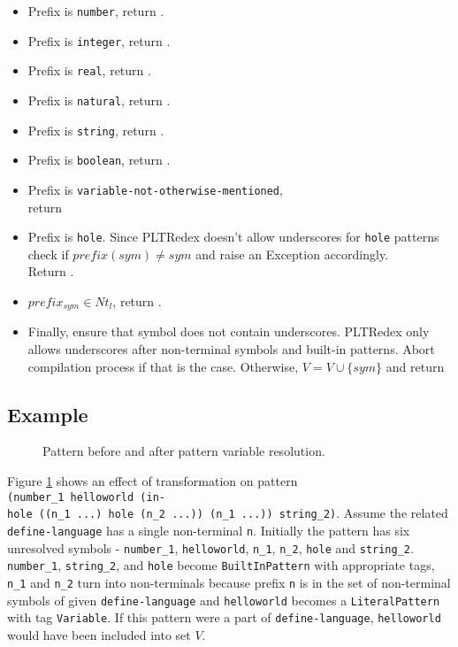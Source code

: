\begin{itemize}
\item Prefix is \texttt{number}, return .
\item Prefix is \texttt{integer}, return .
\item Prefix is \texttt{real}, return .
\item Prefix is \texttt{natural}, return .
\item Prefix is \texttt{string}, return .
\item Prefix is \texttt{boolean}, return .
\item Prefix is \texttt{variable-not-otherwise-mentioned}, \\ return 
\item Prefix is \texttt{hole}. Since PLTRedex doesn't allow underscores for \texttt{hole} patterns check if $\mathit{prefix(sym) \neq sym}$ and raise an Exception accordingly. \\ Return .
\item $\mathit{prefix_{sym} \in Nt_l}$, return .
\item Finally, ensure that symbol does not contain underscores. PLTRedex only allows underscores after non-terminal symbols and built-in patterns. Abort compilation process if that is the case. Otherwise, $V=V\cup\{\mathit{sym}\}$ and return 
\end{itemize}

\subsection{Example}

\begin{figure}[ht]
\caption{Pattern before and after pattern variable resolution.}
\label{transformation-pattern-resolvesym}
\end{figure}

Figure \ref{transformation-pattern-resolvesym} shows an effect of transformation on pattern \texttt{(number\_1\ helloworld\ (in-hole\ ((n\_1\ ...)\ hole\ (n\_2\ ...))\ (n\_1\ ...))\ string\_2)}. Assume the related \texttt{define-language} has a single non-terminal \texttt{n}. Initially the pattern has six unresolved symbols - \texttt{number\_1}, \texttt{helloworld}, \texttt{n\_1}, \texttt{n\_2}, \texttt{hole} and \texttt{string\_2}. \texttt{number\_1}, \texttt{string\_2}, and \texttt{hole} become \texttt{BuiltInPattern} with appropriate tags,  \texttt{n\_1} and \texttt{n\_2} turn into non-terminals because prefix \texttt{n} is in the set of non-terminal symbols of given \texttt{define-language} and \texttt{helloworld} becomes a \texttt{LiteralPattern} with tag \texttt{Variable}. If this pattern were a part of \texttt{define-language}, \texttt{helloworld} would have been included into set $V$.
